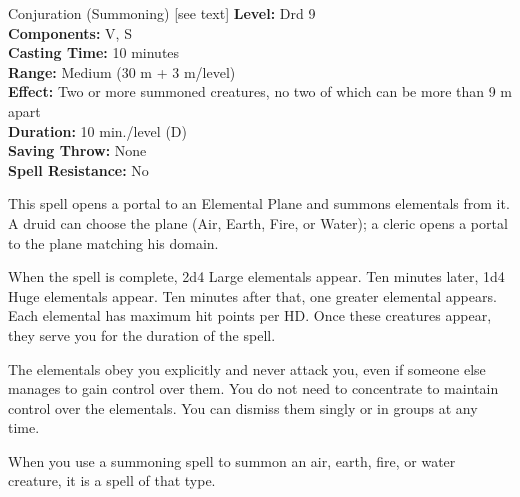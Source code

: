 {Conjuration (Summoning) [see text]}
{
	\textbf{Level:}
	Drd 9\\
	\textbf{Components:}
	V, S\\
	\textbf{Casting Time:}
	10 minutes\\
	\textbf{Range:}
	Medium (30 m + 3 m/level)\\
	\textbf{Effect:}
	Two or more summoned creatures, no two of which can be more than 9 m apart\\
	\textbf{Duration:}
	10 min./level (D)\\
	\textbf{Saving Throw:}
	None\\
	\textbf{Spell Resistance:}
	No\\
}
{
	This spell opens a portal to an Elemental Plane and summons elementals from it. A druid can choose the plane (Air, Earth, Fire, or Water); a cleric opens a portal to the plane matching his domain.

	When the spell is complete, 2d4 Large elementals appear. Ten minutes later, 1d4 Huge elementals appear. Ten minutes after that, one greater elemental appears. Each elemental has maximum hit points per HD. Once these creatures appear, they serve you for the duration of the spell.

	The elementals obey you explicitly and never attack you, even if someone else manages to gain control over them. You do not need to concentrate to maintain control over the elementals. You can dismiss them singly or in groups at any time.

	When you use a summoning spell to summon an air, earth, fire, or water creature, it is a spell of that type.

}
